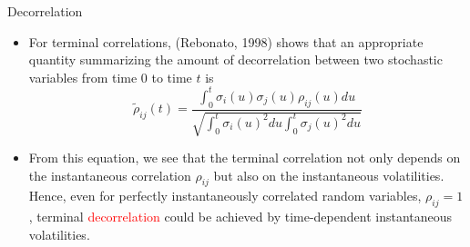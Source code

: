 \documentclass{beamer}
\begin{document}
\begin{frame}{Decorrelation}
	\begin{itemize}
	\item<1-> For terminal correlations, (Rebonato, 1998) shows that an appropriate quantity summarizing the amount of decorrelation between two stochastic variables from time 0 to time $t$ is
	\begin{equation}		
		\tilde{\rho}_{ij}(t)=\frac{\int_0^t\sigma_i(u)\sigma_j(u)\rho_{ij}(u)du}{\sqrt{\int_0^t\sigma_i(u)^2 du\int_0^t\sigma_j(u)^2 du}}	
		\label{eq:terminal_correlation}
	\end{equation}
	\item<2-> From this equation, we see that the terminal correlation not only depends on the instantaneous correlation $\rho_{ij}$ but also on the instantaneous volatilities. Hence, even for perfectly instantaneously correlated random variables, $\rho_{ij}= 1$, terminal \textcolor{red}{decorrelation} could be achieved by time-dependent instantaneous volatilities.
\end{itemize}
\end{frame}	
\end{document}

